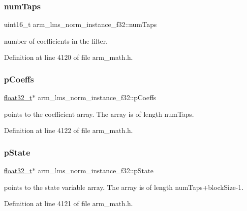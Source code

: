 \subsubsection{\texorpdfstring{num\+Taps}{numTaps}}
{\footnotesize\ttfamily uint16\+\_\+t arm\+\_\+lms\+\_\+norm\+\_\+instance\+\_\+f32\+::num\+Taps}

number of coefficients in the filter. 

Definition at line 4120 of file arm\+\_\+math.\+h.

\mbox{\label{structarm__lms__norm__instance__f32_a1ba688d90aba7de003ed4ad8e2e7ddda}} 
\subsubsection{\texorpdfstring{p\+Coeffs}{pCoeffs}}
{\footnotesize\ttfamily \hyperlink{arm__math_8h_a4611b605e45ab401f02cab15c5e38715}{float32\+\_\+t}$\ast$ arm\+\_\+lms\+\_\+norm\+\_\+instance\+\_\+f32\+::p\+Coeffs}

points to the coefficient array. The array is of length num\+Taps. 

Definition at line 4122 of file arm\+\_\+math.\+h.

\mbox{\label{structarm__lms__norm__instance__f32_a0bc03338687002ed5f2e4a363eb095ec}} 
\subsubsection{\texorpdfstring{p\+State}{pState}}
{\footnotesize\ttfamily \hyperlink{arm__math_8h_a4611b605e45ab401f02cab15c5e38715}{float32\+\_\+t}$\ast$ arm\+\_\+lms\+\_\+norm\+\_\+instance\+\_\+f32\+::p\+State}

points to the state variable array. The array is of length num\+Taps+block\+Size-\/1. 

Definition at line 4121 of file arm\+\_\+math.\+h.

